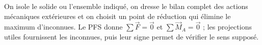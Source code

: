 \begin{corrigebox}[Corrigé]
On isole le solide ou l'ensemble indiqué, on dresse le bilan complet des actions mécaniques extérieures et on choisit un point de réduction qui élimine le maximum d'inconnues. Le PFS donne $\sum\vec F=\vec0$ et $\sum\vec M_A=\vec0$ ; les projections utiles fournissent les inconnues, puis leur signe permet de vérifier le sens supposé.
\end{corrigebox}

